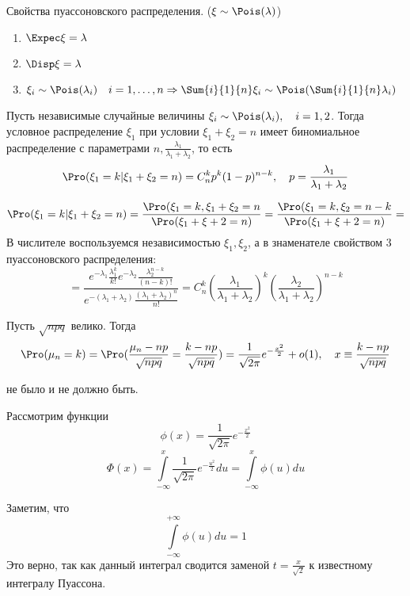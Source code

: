 Свойства пуассоновского распределения. ($\xi \sim \Pois(\lambda)$)
\begin{enumerate}
	\item $\Expec\xi = \lambda$
	\item $\Disp\xi = \lambda$
	\item $\xi_i \sim \Pois(\lambda_i) \quad i = 1, \ldots, n \Rightarrow \Sum{i}{1}{n}\xi_i \sim \Pois(\Sum{i}{1}{n}\lambda_i)$
\end{enumerate}

\begin{St}
Пусть независимые случайные величины $\xi_i \sim \Pois(\lambda_i), \quad i = 1, 2$. Тогда условное распределение $\xi_1$ при условии $\xi_1 + \xi_2 = n$ имеет биномиальное распределение с параметрами $n, \frac{\lambda_1}{\lambda_1 + \lambda_2}$, то есть
$$\Pro(\xi_1 = k | \xi_1 + \xi_2 = n) = C_n^kp^k(1-p)^{n-k}, \quad p = \frac{\lambda_1}{\lambda_1 + \lambda_2}$$
\end{St}
\begin{Proof}
$$\Pro(\xi_1 = k | \xi_1 + \xi_2 = n) = \frac{\Pro(\xi_1 = k, \xi_1 + \xi_2 = n}{\Pro(\xi_1 + \xi+2 = n)} = \frac{\Pro(\xi_1 = k, \xi_2 = n - k}{\Pro(\xi_1 + \xi+2 = n)}=$$
В числителе воспользуемся независимостью $\xi_1, \xi_2$, а в знаменателе свойством 3 пуассоновского распределения:
$$=\frac{e^{-\lambda_1}\frac{\lambda_1^k}{k!}e^{-\lambda_2}\frac{\lambda_2^{n-k}}{(n-k)!}}{e^{-(\lambda_1+\lambda_2)}\frac{(\lambda_1+\lambda_2)^n}{n!}} = 
C_n^k(\frac{\lambda_1}{\lambda_1 + \lambda_2})^k(\frac{\lambda_2}{\lambda_1 + \lambda_2})^{n-k}$$
\end{Proof}

\begin{Th} 
Пусть $\sqrt{npq}$ велико. Тогда
$$\Pro(\mu_n = k) = \Pro(\frac{\mu_n - np}{\sqrt{npq}} = \frac{k - np}{\sqrt{npq}}) = \frac{1}{\sqrt{2\pi}}e^{-\frac{x^2}2} + o(1), \quad x \equiv \frac{k - np}{\sqrt{npq}}$$
\end{Th}
\begin{Proof} не было и не должно быть.
\end{Proof}

Рассмотрим функции
$$\phi(x) = \frac{1}{\sqrt{2\pi}}e^{-\frac{x^2}2}$$
$$\Phi(x) = \int\limits_{-\infty}^x \frac{1}{\sqrt{2\pi}}e^{-\frac{u^2}2} du = \int\limits_{-\infty}^{x}\phi(u)du$$

Заметим, что 
$$\int\limits_{-\infty}^{+\infty} \phi(u)du = 1$$ 
Это верно, так как данный интеграл сводится заменой $t = \frac{x}{\sqrt{2}}$ к известному интегралу Пуассона.

